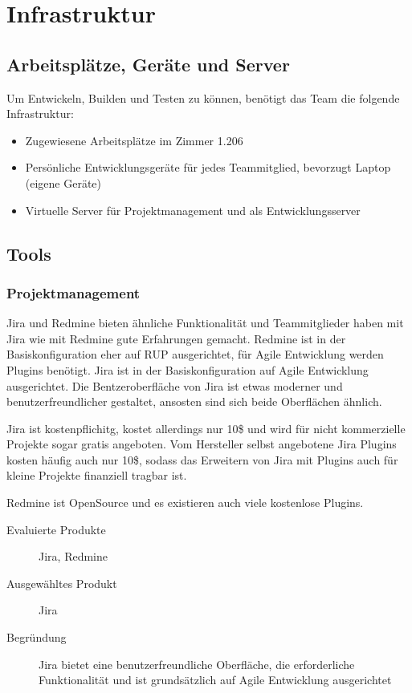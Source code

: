 \chapter*{Infrastruktur}	

	\section*{Arbeitsplätze, Geräte und Server}
		Um Entwickeln, Builden und Testen zu können, benötigt das Team die folgende Infrastruktur:
		\begin{itemize}
			\setlength{\itemsep}{-\parsep}
			\item Zugewiesene Arbeitsplätze im Zimmer 1.206
			\item Persönliche Entwicklungsgeräte für jedes Teammitglied, bevorzugt Laptop (eigene Geräte)
			\item Virtuelle Server für Projektmanagement und als Entwicklungsserver
		\end{itemize}

		
	\section*{Tools}
		\subsection*{Projektmanagement}	
			Jira und Redmine bieten ähnliche Funktionalität und Teammitglieder haben mit Jira wie mit Redmine gute Erfahrungen gemacht. 
			Redmine ist in der Basiskonfiguration eher auf RUP ausgerichtet, für Agile Entwicklung werden Plugins benötigt. 
			Jira ist in der Basiskonfiguration auf Agile Entwicklung ausgerichtet. 
			Die Bentzeroberfläche von Jira ist etwas moderner und benutzerfreundlicher gestaltet, ansosten sind sich beide Oberflächen ähnlich. 
			
			Jira ist kostenpflichitg, kostet allerdings nur 10\$ \cite{atlassan_jira_2014} und wird für nicht kommerzielle Projekte sogar gratis angeboten.
			Vom Hersteller selbst angebotene Jira Plugins kosten häufig auch nur 10\$, 
			sodass das Erweitern von Jira mit Plugins auch für kleine Projekte finanziell tragbar ist.
			
			Redmine ist OpenSource und es existieren auch viele kostenlose Plugins.
		
			\begin{description}
				\item[Evaluierte Produkte] Jira, Redmine
				\item[Ausgewähltes Produkt] Jira
				\item[Begründung] Jira bietet eine benutzerfreundliche Oberfläche, die erforderliche Funktionalität und ist grundsätzlich auf Agile Entwicklung ausgerichtet
			\end{description}


